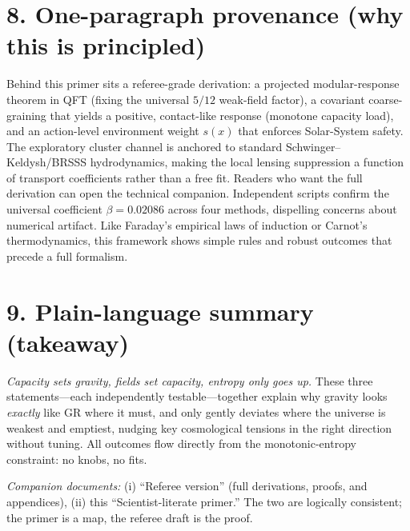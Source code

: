 \documentclass[aps,prd,onecolumn,superscriptaddress,nofootinbib]{revtex4-2}
\begin{document}
\section*{8. One-paragraph provenance (why this is principled)}
Behind this primer sits a referee-grade derivation: a projected modular-response theorem in QFT (fixing the universal $5/12$ weak-field factor), a covariant coarse-graining that yields a positive, contact-like response (monotone capacity load), and an action-level environment weight $s(x)$ that enforces Solar-System safety. The exploratory cluster channel is anchored to standard Schwinger--Keldysh/BRSSS hydrodynamics, making the local lensing suppression a function of transport coefficients rather than a free fit. Readers who want the full derivation can open the technical companion.
Independent scripts confirm the universal coefficient $\beta = 0.02086$ across four methods, dispelling concerns about numerical artifact. Like Faraday's empirical laws of induction or Carnot's thermodynamics, this framework shows simple rules and robust outcomes that precede a full formalism.

\section*{9. Plain-language summary (takeaway)}
\emph{Capacity sets gravity, fields set capacity, entropy only goes up.} These three statements---each independently testable---together explain why gravity looks \emph{exactly} like GR where it must, and only gently deviates where the universe is weakest and emptiest, nudging key cosmological tensions in the right direction without tuning.
All outcomes flow directly from the monotonic-entropy constraint: no knobs, no fits.

\bigskip
\noindent\textit{Companion documents:} (i) ``Referee version'' (full derivations, proofs, and appendices), (ii) this ``Scientist-literate primer.'' The two are logically consistent; the primer is a map, the referee draft is the proof.
\end{document}
